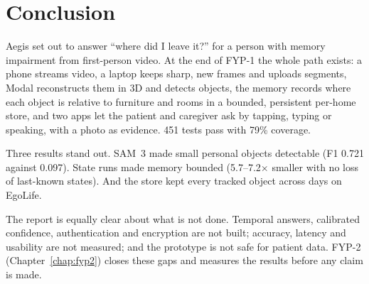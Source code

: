 \chapter{Conclusion}
\label{chap:conclusion}
Aegis set out to answer ``where did I leave it?'' for a person with memory
impairment from first-person video. At the end of FYP-1 the whole path exists: a
phone streams video, a laptop keeps sharp, new frames and uploads segments,
Modal reconstructs them in 3D and detects objects, the memory records where each
object is relative to furniture and rooms in a bounded, persistent per-home
store, and two apps let the patient and caregiver ask by tapping, typing or
speaking, with a photo as evidence. 451 tests pass with 79\% coverage.

Three results stand out. SAM~3 made small personal objects detectable (F1 0.721
against 0.097). State runs made memory bounded (5.7--7.2$\times$ smaller with no
loss of last-known states). And the store kept every tracked object across days
on EgoLife.

The report is equally clear about what is not done. Temporal answers,
calibrated confidence, authentication and encryption are not built; accuracy,
latency and usability are not measured; and the prototype is not safe for
patient data. FYP-2 (Chapter~\ref{chap:fyp2}) closes these gaps and measures
the results before any claim is made.
